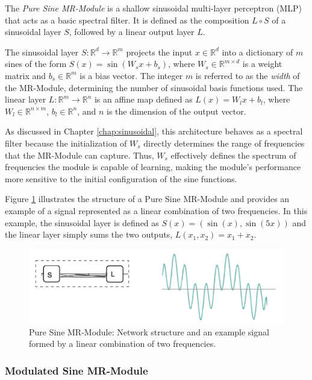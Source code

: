 The \textit{Pure Sine MR-Module} is a shallow sinusoidal multi-layer perceptron (MLP) that acts as a basic spectral filter. It is defined as the composition \( L \circ S \) of a sinusoidal layer \( S \), followed by a linear output layer \( L \).

The sinusoidal layer \( S\!:\!\mathbb{R}^d\!\to\! \mathbb{R}^m \) projects the input \( x \in \mathbb{R}^d \) into a dictionary of \( m \) sines of the form \( S(x) = \sin\left(W_s x + b_s\right) \), where \( W_s \in \mathbb{R}^{m \times d} \) is a weight matrix and \( b_s \in \mathbb{R}^m \) is a bias vector. The integer \( m \) is referred to as the \textit{width} of the MR-Module, determining the number of sinusoidal basis functions used. The linear layer \( L\!:\!\mathbb{R}^m\!\to\! \mathbb{R}^n \) is an affine map defined as \( L(x) = W_l x + b_l \), where \( W_l \in \mathbb{R}^{n \times m} \), \( b_l \in \mathbb{R}^n \), and $n$ is the dimension of the output vector.

As discussed in Chapter \ref{chap:sinusoidal}, this architecture behaves as a spectral filter because the initialization of \( W_s \) directly determines the range of frequencies that the MR-Module can capture. Thus, \( W_s \) effectively defines the spectrum of frequencies the module is capable of learning, making the module's performance more sensitive to the initial configuration of the sine functions.

Figure \ref{f:pure-sine} illustrates the structure of a Pure Sine MR-Module and provides an example of a signal represented as a linear combination of two frequencies. In this example, the sinusoidal layer is defined as \( S(x) = (\sin(x), \sin(5x)) \) and the linear layer simply sums the two outputs, \( L(x_1, x_2) = x_1 + x_2 \).

\begin{figure}[!h]
\centering
\includegraphics[width=0.8\linewidth]{img/ch4/pure-sine.png}
\caption{Pure Sine MR-Module: Network structure and an example signal formed by a linear combination of two frequencies.}
\label{f:pure-sine}
\end{figure}

\subsubsection{Modulated Sine MR-Module}

